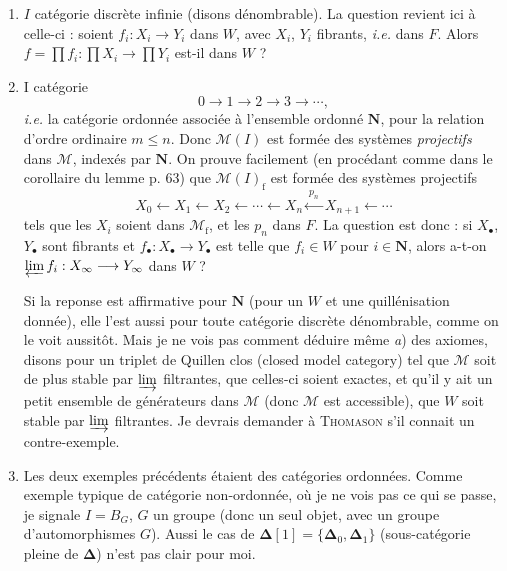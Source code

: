 \documentclass[11pt]{article}
\newcommand{\printedpage}[1]{\marginpar{\footnotesize p.~#1}}
\newcommand{\msp}[1]{\marginpar{\footnotesize [#1]}}
\newcommand{\rf}{\mathrm{f}}
\newcommand{\M}{\mathcal{M}}
\begin{document}
\begin{enumerate}
\item[\textit{a})] $I$ catégorie discrète infinie (disons dénombrable). La question revient ici à celle-ci : soient $f_i : X_i \longrightarrow Y_i$ dans $W$, avec $X_i$, $Y_i$ fibrants, \textit{i.e.} dans $F$. Alors $f = \prod f_i : \prod X_i \longrightarrow \prod Y_i$ est-il dans $W$ ?

\msp{page 73}

\item[\textit{b})] I catégorie %
\[
0 \longrightarrow 1 \longrightarrow 2 \longrightarrow 3 \longrightarrow \cdots,
\]
\textit{i.e.} la catégorie ordonnée associée à l'ensemble ordonné $\mathbf{N}$, pour la relation d'ordre ordinaire $m \leq n$. Donc $\M(I)$ est formée des systèmes \textit{projectifs} dans $\M$, indexés par $\mathbf{N}$. On prouve facilement (en procédant comme dans le corollaire du lemme p. 63) que $\M(I)_{\rf}$ est formée des systèmes projectifs
\[
X_0 \longleftarrow X_1 \longleftarrow X_2 \longleftarrow \cdots \longleftarrow X_n \xleftarrow{\ p_n\ } X_{n+1} \longleftarrow \cdots
\]
tels que les $X_i$ soient dans $\M_{\rf}$, et les $p_n$ dans $F$. La question est donc : si $X_\bullet$, $Y_\bullet$ sont fibrants et $f_\bullet : X_\bullet \longrightarrow Y_\bullet$ est telle que $f_i \in W$ pour $i \in \mathbf{N}$, alors a-t-on $\varprojlim f_i : X_\infty \longrightarrow Y_\infty$ dans $W$ ?

Si la reponse est affirmative pour $\mathbf{N}$ (pour un $W$ et une quillénisation donnée), elle %
l'est aussi pour toute catégorie discrète dénombrable, comme on le voit aussitôt. Mais je ne vois pas comment déduire même \textit{a}) des axiomes, disons pour un triplet de Quillen clos (closed model category) tel que $\M$ soit de plus stable par $\varinjlim$ filtrantes, que celles-ci soient exactes, et qu'il y ait
\printedpage{41}
\msp{page 74}
un petit ensemble de générateurs dans $\M$ (donc $\M$ est accessible), que $W$ soit stable par $\varinjlim$ filtrantes. Je devrais demander à \textsc{Thomason} s'il connait un contre-exemple. %

\item[\textit{c})] Les deux exemples précédents étaient des catégories ordonnées. Comme exemple typique de catégorie non-ordonnée, où je ne vois pas ce qui se passe, je signale $I = B_G$, $G$ un groupe (donc un seul objet, avec un groupe d'automorphismes $G$). Aussi le cas de $\boldsymbol{\Delta}[1] = \{\boldsymbol{\Delta}_0, \boldsymbol{\Delta}_1\}$ (sous-catégorie pleine de $\boldsymbol{\Delta}$) n'est pas clair pour moi.
\end{enumerate}
\end{document}
